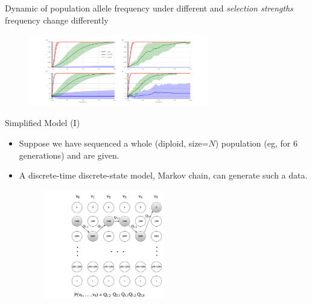 \documentclass[t]{beamer} %
\begin{document}
\begin{frame}{Dynamic of population allele frequency }
	under different  and \emph{selection strengths} 
	frequency 
	change differently
	\begin{figure}
		\includegraphics[trim={10in 0.0in 0.0in 
			0in},clip,width=0.7\textwidth]{../figures/AF}
	\end{figure}
\end{frame}


\begin{frame}{ Simplified Model (I)}
	\begin{itemize}
		\item  Suppose we have sequenced a whole (diploid, size=$N$) 
		population  (eg, for 6 generations) and  are given.
	\pause
		\item A discrete-time discrete-state model, Markov chain, can 
		generate such a data.
		\begin{figure}
			\includegraphics[trim={.05in 0in 0.0in 
				0.5in},clip,width=0.5\textwidth]{../figures/markoveg}
		\end{figure}
	\end{itemize}
\end{frame}
\end{document}
